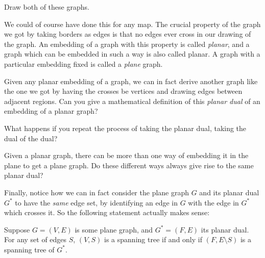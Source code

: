 \documentclass[nobib]{tufte-handout}
\begin{document}
\begin{xca}
  Draw both of these graphs.
\end{xca}

\begin{xca}
  We could of course have done this for any map. The crucial property of the graph we got by taking borders as edges is that no edges ever cross in our drawing of the graph. An embedding of a graph with this property is called \emph{planar}, and a graph which can be embedded in such a way is also called planar. A graph with a particular embedding fixed is called a \emph{plane} graph.

  Given any planar embedding of a graph, we can in fact derive another graph like the one we got by having the crosses be vertices and drawing edges between adjacent regions. Can you give a mathematical definition of this \emph{planar dual} of an embedding of a planar graph?
\end{xca}

\begin{xca}
  What happens if you repeat the process of taking the planar dual, taking the dual of the dual?
\end{xca}

\begin{xca}
  Given a planar graph, there can be more than one way of embedding it in the plane to get a plane graph. Do these different ways always give rise to the same planar dual?
\end{xca}

Finally, notice how we can in fact consider the plane graph $G$ and its planar dual $G^*$ to have the \emph{same} edge set, by identifying an edge in $G$ with the edge in $G^*$ which crosses it. So the following statement actually makes sense:

\begin{lemma}
  Suppose $G = (V,E)$ is some plane graph, and $G^* = (F, E)$ its planar dual. For any set of edges $S$, $(V, S)$ is a spanning tree if and only if $(F, E \setminus S)$ is a spanning tree of $G^*$.
\end{lemma}
\end{document}
